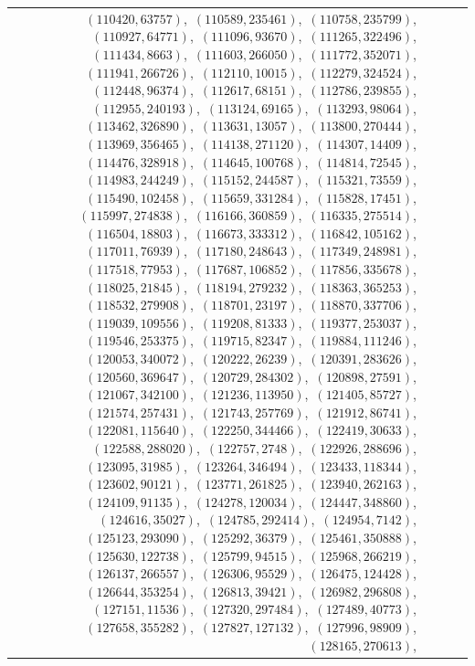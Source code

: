 \documentclass[11pt]{article}
\begin{document}
\begin{longtable}{@{}rrl>{\raggedright\arraybackslash}p{}@{}}
$(110420,63757)$,\allowbreak\ $(110589,235461)$,\allowbreak\ $(110758,235799)$,\allowbreak\ $(110927,64771)$,\allowbreak\ $(111096,93670)$,\allowbreak\ $(111265,322496)$,\allowbreak\ $(111434,8663)$,\allowbreak\ $(111603,266050)$,\allowbreak\ $(111772,352071)$,\allowbreak\ $(111941,266726)$,\allowbreak\ $(112110,10015)$,\allowbreak\ $(112279,324524)$,\allowbreak\ $(112448,96374)$,\allowbreak\ $(112617,68151)$,\allowbreak\ $(112786,239855)$,\allowbreak\ $(112955,240193)$,\allowbreak\ $(113124,69165)$,\allowbreak\ $(113293,98064)$,\allowbreak\ $(113462,326890)$,\allowbreak\ $(113631,13057)$,\allowbreak\ $(113800,270444)$,\allowbreak\ $(113969,356465)$,\allowbreak\ $(114138,271120)$,\allowbreak\ $(114307,14409)$,\allowbreak\ $(114476,328918)$,\allowbreak\ $(114645,100768)$,\allowbreak\ $(114814,72545)$,\allowbreak\ $(114983,244249)$,\allowbreak\ $(115152,244587)$,\allowbreak\ $(115321,73559)$,\allowbreak\ $(115490,102458)$,\allowbreak\ $(115659,331284)$,\allowbreak\ $(115828,17451)$,\allowbreak\ $(115997,274838)$,\allowbreak\ $(116166,360859)$,\allowbreak\ $(116335,275514)$,\allowbreak\ $(116504,18803)$,\allowbreak\ $(116673,333312)$,\allowbreak\ $(116842,105162)$,\allowbreak\ $(117011,76939)$,\allowbreak\ $(117180,248643)$,\allowbreak\ $(117349,248981)$,\allowbreak\ $(117518,77953)$,\allowbreak\ $(117687,106852)$,\allowbreak\ $(117856,335678)$,\allowbreak\ $(118025,21845)$,\allowbreak\ $(118194,279232)$,\allowbreak\ $(118363,365253)$,\allowbreak\ $(118532,279908)$,\allowbreak\ $(118701,23197)$,\allowbreak\ $(118870,337706)$,\allowbreak\ $(119039,109556)$,\allowbreak\ $(119208,81333)$,\allowbreak\ $(119377,253037)$,\allowbreak\ $(119546,253375)$,\allowbreak\ $(119715,82347)$,\allowbreak\ $(119884,111246)$,\allowbreak\ $(120053,340072)$,\allowbreak\ $(120222,26239)$,\allowbreak\ $(120391,283626)$,\allowbreak\ $(120560,369647)$,\allowbreak\ $(120729,284302)$,\allowbreak\ $(120898,27591)$,\allowbreak\ $(121067,342100)$,\allowbreak\ $(121236,113950)$,\allowbreak\ $(121405,85727)$,\allowbreak\ $(121574,257431)$,\allowbreak\ $(121743,257769)$,\allowbreak\ $(121912,86741)$,\allowbreak\ $(122081,115640)$,\allowbreak\ $(122250,344466)$,\allowbreak\ $(122419,30633)$,\allowbreak\ $(122588,288020)$,\allowbreak\ $(122757,2748)$,\allowbreak\ $(122926,288696)$,\allowbreak\ $(123095,31985)$,\allowbreak\ $(123264,346494)$,\allowbreak\ $(123433,118344)$,\allowbreak\ $(123602,90121)$,\allowbreak\ $(123771,261825)$,\allowbreak\ $(123940,262163)$,\allowbreak\ $(124109,91135)$,\allowbreak\ $(124278,120034)$,\allowbreak\ $(124447,348860)$,\allowbreak\ $(124616,35027)$,\allowbreak\ $(124785,292414)$,\allowbreak\ $(124954,7142)$,\allowbreak\ $(125123,293090)$,\allowbreak\ $(125292,36379)$,\allowbreak\ $(125461,350888)$,\allowbreak\ $(125630,122738)$,\allowbreak\ $(125799,94515)$,\allowbreak\ $(125968,266219)$,\allowbreak\ $(126137,266557)$,\allowbreak\ $(126306,95529)$,\allowbreak\ $(126475,124428)$,\allowbreak\ $(126644,353254)$,\allowbreak\ $(126813,39421)$,\allowbreak\ $(126982,296808)$,\allowbreak\ $(127151,11536)$,\allowbreak\ $(127320,297484)$,\allowbreak\ $(127489,40773)$,\allowbreak\ $(127658,355282)$,\allowbreak\ $(127827,127132)$,\allowbreak\ $(127996,98909)$,\allowbreak\ $(128165,270613)$,\allowbreak\ 
\end{longtable}
\end{document}
